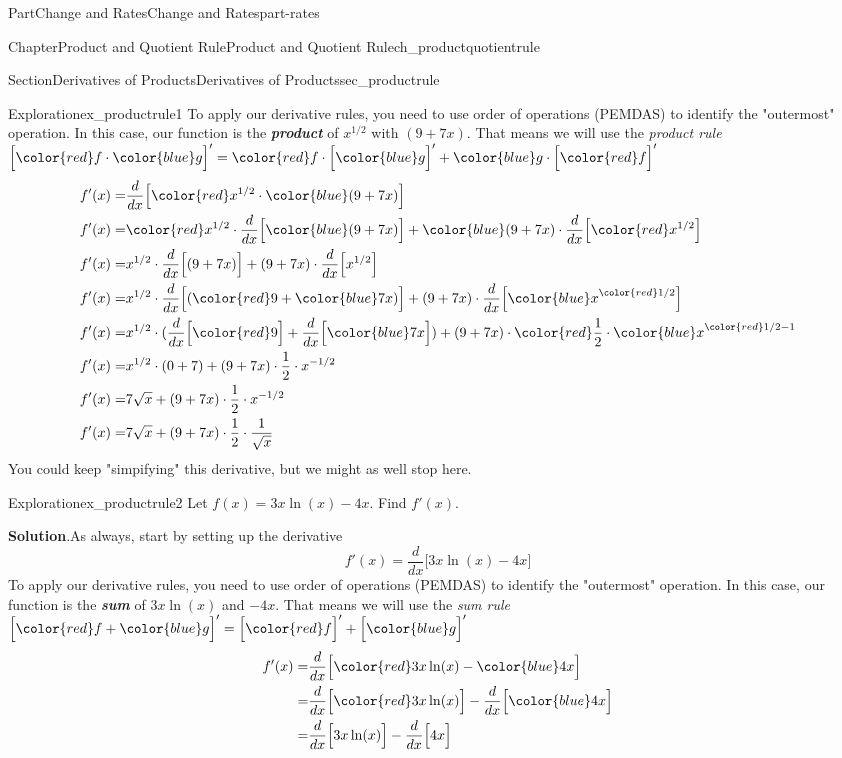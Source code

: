 \documentclass{tufte-book}
\newcommand{\blocktitlefont}{\relax}
\newcommand{\alert}[1]{\textbf{\textit{#1}}}
\numberwithin{equation}{chapter}
\newcommand{\red}[1]{   {\color{red}   #1}   }
\newcommand{\blue}[1]{  {\color{blue}  #1}  }
\newcommand{\ddx}[1]{ \dfrac{d}{dx} \Big[ #1 \Big]  }
\newcommand{\D}[1]{ \Big[ #1 \Big]'  }
\newcommand{\amp}{&}
\begin{document}
\begin{partptx}{Part}{Change and Rates}{}{Change and Rates}{}{}{part-rates}
\begin{chapterptx}{Chapter}{Product and Quotient Rule}{}{Product and Quotient Rule}{}{}{ch_productquotientrule}
\begin{sectionptx}{Section}{Derivatives of Products}{}{Derivatives of Products}{}{}{sec_productrule}
\begin{exploration}{Exploration}{}{ex_productrule1}
To apply our derivative rules, you need to use order of operations (PEMDAS) to identify the "outermost" operation. In this case, our function is the \alert{product} of \(x^{1/2}\) with \((9+7x)\).  That means we will use the \emph{product rule} \(\D{\red{f}\cdot \blue{g}} = \red{f}\cdot \D{\blue{g}} + \blue{g}\cdot \D{\red{f}}\)%
\begin{align*}
f'(x)  = \amp \ddx{ \red{x^{1/2}} \cdot \blue{(9 + 7x)} } \\
f'(x)  = \amp \red{x^{1/2}} \cdot \ddx{ \blue{(9 + 7x)} } + \blue{(9 + 7x)} \cdot \ddx{ \red{x^{1/2}} } \\
f'(x)  = \amp x^{1/2} \cdot \ddx{ (9 + 7x) } + (9 + 7x) \cdot \ddx{ x^{1/2} } \\
f'(x)  = \amp x^{1/2} \cdot \ddx{ (\red{9} + \blue{7x}) } + (9 + 7x) \cdot \ddx{ \blue{x}^{\red{1/2}} } \\
f'(x)  = \amp x^{1/2} \cdot (\ddx{\red{9}} + \ddx{\blue{7x}})  + (9 + 7x) \cdot \red{\frac{1}{2}}\cdot \blue{x}^{\red{1/2}-1}  \\
f'(x)  = \amp x^{1/2} \cdot (0 + 7)  + (9 + 7x) \cdot \frac{1}{2} \cdot x^{-1/2}  \\
f'(x)  = \amp 7\sqrt{x}  + (9 + 7x) \cdot \frac{1}{2} \cdot x^{-1/2}  \\
f'(x)  = \amp 7\sqrt{x}  + (9 + 7x) \cdot \frac{1}{2} \cdot \frac{1}{\sqrt{x}} 
\end{align*}
You could keep "simpifying" this derivative, but we might as well stop here.%
\end{exploration}%
\begin{exploration}{Exploration}{}{ex_productrule2}%
Let \(f(x) = 3x\ln(x) - 4x\). Find \(f'(x)\).%
\par\smallskip%
\noindent\textbf{\blocktitlefont Solution}.\hypertarget{ex_productrule2-2}{}\quad{}As always, start by setting up the derivative%
\begin{equation*}
f'(x) = \ddx{3x\ln(x) - 4x} 
\end{equation*}
To apply our derivative rules, you need to use order of operations (PEMDAS) to identify the "outermost" operation. In this case, our function is the \alert{sum} of \(3x\ln(x)\) and  \(-4x\).  That means we will use the \emph{sum rule} \(\D{\red{f} + \blue{g}} = \D{\red{f}} + \D{\blue{g}}\)%
\begin{align*}
f'(x) = \amp \ddx{ \red{3x\ln(x)} - \blue{4x}  } \\
= \amp \ddx{ \red{3x\ln(x)} } - \ddx{\blue{4x}  } \\
= \amp \ddx{ 3x\ln(x) } - \ddx{ 4x  } 

\end{align*}
\end{exploration}
\end{sectionptx}
\end{chapterptx}
\end{partptx}
\end{document}
